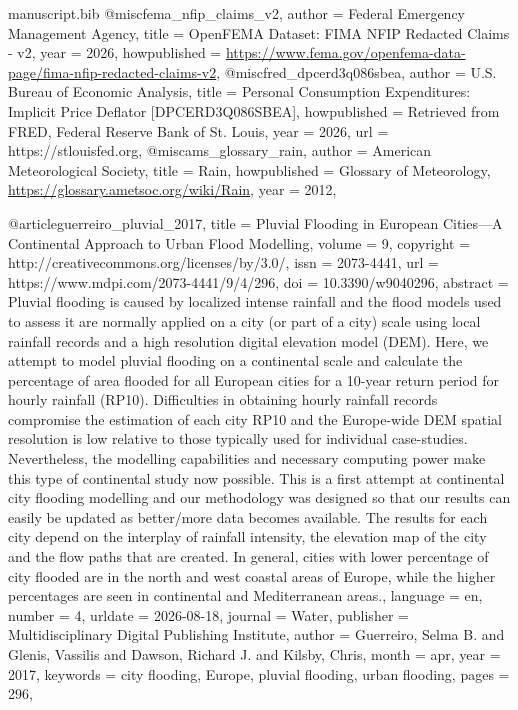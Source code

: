 \begin{filecontents*}[force]{manuscript.bib}
@misc{fema_nfip_claims_v2,
  author       = {{Federal Emergency Management Agency}},
  title        = {{OpenFEMA Dataset: FIMA NFIP Redacted Claims - v2}},
  year         = {2026},
  howpublished = {\url{https://www.fema.gov/openfema-data-page/fima-nfip-redacted-claims-v2}},
}
@misc{fred_dpcerd3q086sbea,
  author       = {{U.S. Bureau of Economic Analysis}},
  title        = {Personal Consumption Expenditures: Implicit Price Deflator [DPCERD3Q086SBEA]},
  howpublished = {Retrieved from FRED, Federal Reserve Bank of St. Louis},
  year         = {2026},
  url          = {https://stlouisfed.org},
}
@misc{ams_glossary_rain,
  author       = {{American Meteorological Society}},
  title        = {Rain},
  howpublished = {Glossary of Meteorology, \url{https://glossary.ametsoc.org/wiki/Rain}},
  year         = {2012},
}

@article{guerreiro_pluvial_2017,
	title = {Pluvial {Flooding} in {European} {Cities}—{A} {Continental} {Approach} to {Urban} {Flood} {Modelling}},
	volume = {9},
	copyright = {http://creativecommons.org/licenses/by/3.0/},
	issn = {2073-4441},
	url = {https://www.mdpi.com/2073-4441/9/4/296},
	doi = {10.3390/w9040296},
	abstract = {Pluvial flooding is caused by localized intense rainfall and the flood models used to assess it are normally applied on a city (or part of a city) scale using local rainfall records and a high resolution digital elevation model (DEM). Here, we attempt to model pluvial flooding on a continental scale and calculate the percentage of area flooded for all European cities for a 10-year return period for hourly rainfall (RP10). Difficulties in obtaining hourly rainfall records compromise the estimation of each city RP10 and the Europe-wide DEM spatial resolution is low relative to those typically used for individual case-studies. Nevertheless, the modelling capabilities and necessary computing power make this type of continental study now possible. This is a first attempt at continental city flooding modelling and our methodology was designed so that our results can easily be updated as better/more data becomes available. The results for each city depend on the interplay of rainfall intensity, the elevation map of the city and the flow paths that are created. In general, cities with lower percentage of city flooded are in the north and west coastal areas of Europe, while the higher percentages are seen in continental and Mediterranean areas.},
	language = {en},
	number = {4},
	urldate = {2026-08-18},
	journal = {Water},
	publisher = {Multidisciplinary Digital Publishing Institute},
	author = {Guerreiro, Selma B. and Glenis, Vassilis and Dawson, Richard J. and Kilsby, Chris},
	month = apr,
	year = {2017},
	keywords = {city flooding, Europe, pluvial flooding, urban flooding},
	pages = {296},
}



\end{filecontents*}
